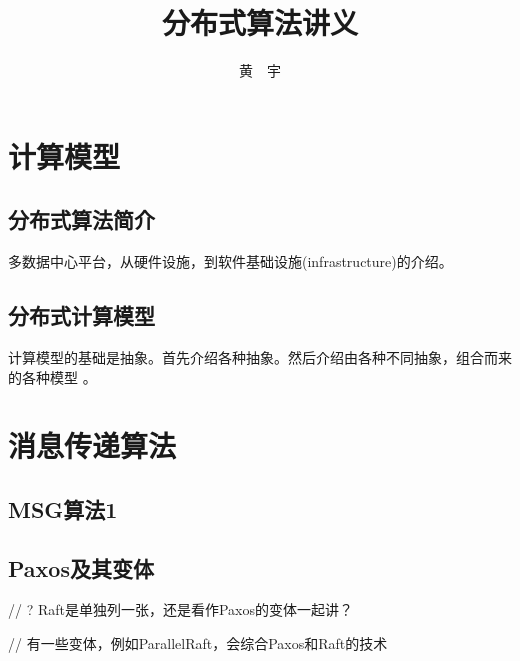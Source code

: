\documentclass[UTF8]{ctexrep}
\begin{document}
\title{\Huge \bf 分布式算法讲义}

\author{黄\ \ 宇}

\maketitle

\tableofcontents

\part{计算模型}

\chapter{分布式算法简介}

\cite{Barroso18}

多数据中心平台，从硬件设施，到软件基础设施(infrastructure)的介绍。


\chapter{分布式计算模型}

计算模型的基础是抽象。首先介绍各种抽象。然后介绍由各种不同抽象，组合而来的各种模型 \cite{Cachin11}。


\part{消息传递算法}

\chapter{MSG算法1}



\chapter{Paxos及其变体}

// ? Raft是单独列一张，还是看作Paxos的变体一起讲？

// 有一些变体，例如ParallelRaft，会综合Paxos和Raft的技术
\end{document}

